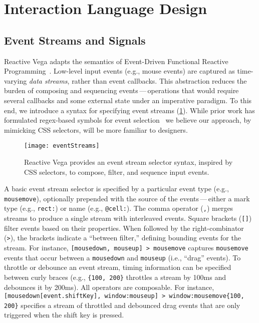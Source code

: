 \section{Interaction Language Design}
\label{sec:vg:primitives}

\vspace{-10pt}

\subsection{Event Streams and Signals}
\label{sec:vg:events}

Reactive Vega adapts the semantics of Event-Driven Functional Reactive
Programming~\cite{wan:efrp}. Low-level input events (e.g., mouse events) are
captured as time-varying \emph{data streams}, rather than event callbacks. This
abstraction reduces the burden of composing and sequencing
events\,---\,operations that would require several callbacks and some external
state under an imperative paradigm. To this end, we introduce a syntax for
specifying event streams (\cref{fig:vg:eventStreams}). While prior work has
formulated regex-based symbols for event selection~\cite{kin:proton++} we
believe our approach, by mimicking CSS selectors, will be more familiar to
designers.

\begin{figure}[t!]
  \centering
  \texttt{[image: eventStreams]}
  \caption{Reactive Vega provides an event stream selector syntax, inspired by
  CSS selectors, to compose, filter, and sequence input events.}
  \label{fig:vg:eventStreams}
\end{figure}

A basic event stream selector is specified by a particular event type (e.g.,
\texttt{mousemove}), optionally prepended with the source of the
events\,---\,either a mark type (e.g., \texttt{rect:}) or name (e.g.,
\texttt{@cell:}). The comma operator (\texttt{,}) merges streams to produce a
single stream with interleaved events. Square brackets (\texttt{[]}) filter
events based on their properties. When followed by the right-combinator
(\texttt{>}), the brackets indicate a ``between filter,'' defining bounding
events for the stream. For instance, \texttt{[mousedown, mouseup] > mousemove}
captures \texttt{mousemove} events that occur between a \texttt{mousedown} and
\texttt{mouseup} (i.e., ``drag'' events). To throttle or debounce an event
stream, timing information can be specified between curly braces (e.g.,
\texttt{\{100, 200\}} throttles a stream by 100ms and debounces it by 200ms).
All operators are composable. For instance, \texttt{[mousedown[event.shiftKey],
window:mouseup] > window:mousemove\{100, 200\}} specifies a stream of throttled
and debounced drag events that are only triggered when the shift key is pressed.

